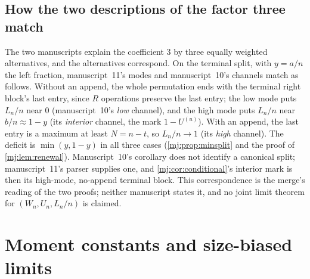 \documentclass[11pt,a4paper]{article}
\theoremstyle{definition}\newaliascnt{definition}{theorem}
\theoremstyle{remark}\newaliascnt{remark}{theorem}
\begin{document}
\subsection{How the two descriptions of the factor three match}
\label{mj:sec:three-match}
The two manuscripts explain the coefficient $3$ by three equally weighted
alternatives, and the alternatives correspond. On the terminal split, with
$y=a/n$ the left fraction, manuscript~11's modes and manuscript~10's channels
match as follows. Without an append, the whole permutation ends with the
terminal right block's last entry, since $R$ operations preserve the last
entry; the low mode puts $L_n/n$ near $0$ (manuscript~10's \emph{low}
channel), and the high mode puts $L_n/n$ near $b/n\approx1-y$ (its
\emph{interior} channel, the mark $1-U^{(u)}$). With an append, the last entry
is a maximum at least $N=n-t$, so $L_n/n\to1$ (its \emph{high} channel). The
deficit is $\min(y,1-y)$ in all three cases (\cref{mj:prop:minsplit} and the
proof of \cref{mj:lem:renewal}). Manuscript~10's corollary does not identify
a canonical split; manuscript~11's parser supplies one, and
\cref{mj:cor:conditional}'s interior mark is then its high-mode, no-append
terminal block. This correspondence is the merge's reading of the two proofs;
neither manuscript states it, and no joint limit theorem for $(W_n,U_n,L_n/n)$
is claimed.

\section{Moment constants and size-biased limits}
\label{mj:sec:moments}
\end{document}
